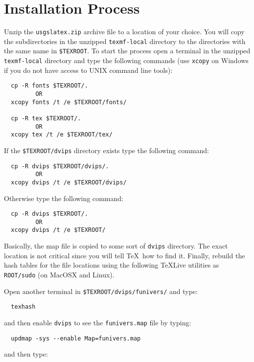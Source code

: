 \documentclass[11pt]{article}
\begin{document}
\section*{\textsf{Installation Process}}

Unzip the \texttt{usgslatex.zip} archive file to a location of your choice. You will copy the subdirectories in the unzipped \texttt{texmf-local} directory to the directories with the same name in \texttt{\$TEXROOT}. To start the process open a terminal in the unzipped \texttt{texmf-local} directory and type the following commands (use \texttt{xcopy} on Windows if you do not have access to UNIX command line tools):

\begin{verbatim}
  cp -R fonts $TEXROOT/. 
         OR 
  xcopy fonts /t /e $TEXROOT/fonts/

  cp -R tex $TEXROOT/.
         OR 
  xcopy tex /t /e $TEXROOT/tex/
\end{verbatim}

If the \texttt{\$TEXROOT/dvips} directory exists type the following command: 

\begin{verbatim}
  cp -R dvips $TEXROOT/dvips/.  
         OR
  xcopy dvips /t /e $TEXROOT/dvips/
\end{verbatim}

Otherwise type the following command:

\begin{verbatim}
  cp -R dvips $TEXROOT/.
         OR
  xcopy dvips /t /e $TEXROOT/
\end{verbatim}

Basically, the map file is copied to some sort of \texttt{dvips} directory. The exact location is not critical since you will tell \TeX\ how to find it. Finally, rebuild the hash tables for the file locations using the following \TeX Live utilities as \texttt{ROOT/sudo} (on MacOSX and Linux).

Open another terminal in \texttt{\$TEXROOT/dvips/funivers/} and type:

\begin{verbatim}
  texhash
\end{verbatim}

\noindent and then enable \texttt{dvips} to see the \texttt{funivers.map} file by typing:
\begin{verbatim}
  updmap -sys --enable Map=funivers.map
\end{verbatim}

and then type:
\end{document}
